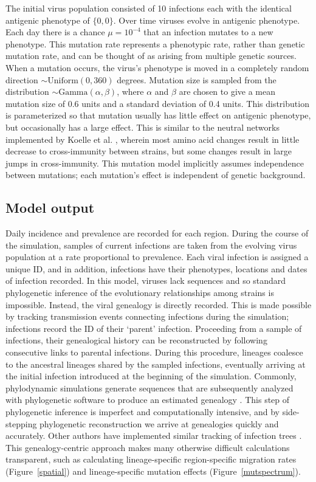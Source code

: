 \documentclass[11pt,oneside,letterpaper]{article}
\begin{document}
The initial virus population consisted of 10 infections each with the identical antigenic phenotype of $\{0,0\}$.  Over time viruses evolve in antigenic phenotype.  Each day there is a chance $\mu = 10^{-4}$ that an infection mutates to a new phenotype.  This mutation rate represents a phenotypic rate, rather than genetic mutation rate, and can be thought of as arising from multiple genetic sources.  When a mutation occurs, the virus's phenotype is moved in a completely random direction $\sim \textrm{Uniform}(0,360)$ degrees. Mutation size is sampled from the distribution $\sim \textrm{Gamma}(\alpha,\beta)$, where $\alpha$ and $\beta$ are chosen to give a mean mutation size of 0.6 units and a standard deviation of 0.4 units.  This distribution is parameterized so that mutation usually has little effect on antigenic phenotype, but occasionally has a large effect.  This is similar to the neutral networks implemented by Koelle et al. \cite{Koelle06}, wherein most amino acid changes result in little decrease to cross-immunity between strains, but some changes result in large jumps in cross-immunity.  This mutation model implicitly assumes independence between mutations; each mutation's effect is independent of genetic background.

\subsection*{Model output}

Daily incidence and prevalence are recorded for each region.  During the course of the simulation, samples of current infections are taken from the evolving virus population at a rate proportional to prevalence.  Each viral infection is assigned a unique ID, and in addition, infections have their phenotypes, locations and dates of infection recorded.  In this model, viruses lack sequences and so standard phylogenetic inference of the evolutionary relationships among strains is impossible.  Instead, the viral genealogy is directly recorded.  This is made possible by tracking transmission events connecting infections during the simulation; infections record the ID of their `parent' infection.  Proceeding from a sample of infections, their genealogical history can be reconstructed by following consecutive links to parental infections.  During this procedure, lineages coalesce to the ancestral lineages shared by the sampled infections, eventually arriving at the initial infection introduced at the beginning of the simulation.  Commonly, phylodynamic simulations generate sequences that are subsequently analyzed with phylogenetic software to produce an estimated genealogy \cite{Ferguson03,Koelle06,Koelle10}.  This step of phylogenetic inference is imperfect and computationally intensive, and by side-stepping phylogenetic reconstruction we arrive at genealogies quickly and accurately.  Other authors have implemented similar tracking of infection trees \cite{Volz09,Odea11}.  This genealogy-centric approach makes many otherwise difficult calculations transparent, such as calculating lineage-specific region-specific migration rates (Figure~\ref{spatial}) and lineage-specific mutation effects (Figure~\ref{mutspectrum}).
\end{document}
